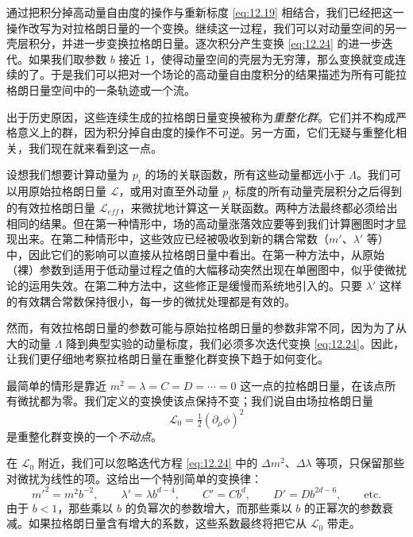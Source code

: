 通过把积分掉高动量自由度的操作与重新标度 \eqref{eq:12.19} 相结合，我们已经把这一操作改写为对拉格朗日量的一个变换。继续这一过程，我们可以对动量空间的另一壳层积分，并进一步变换拉格朗日量。逐次积分产生变换 \eqref{eq:12.24} 的进一步迭代。如果我们取参数 $b$ 接近 1，使得动量空间的壳层为无穷薄，那么变换就变成连续的了。于是我们可以把对一个场论的高动量自由度积分的结果描述为所有可能拉格朗日量空间中的一条轨迹或一个流。

出于历史原因，这些连续生成的拉格朗日量变换被称为\emph{重整化群}。它们并不构成严格意义上的群，因为积分掉自由度的操作不可逆。另一方面，它们无疑与重整化相关，我们现在就来看到这一点。

设想我们想要计算动量为 $p_i$ 的场的关联函数，所有这些动量都远小于 $\Lambda$。我们可以用原始拉格朗日量 $\mathcal{L}$，或用对直至外动量 $p_i$ 标度的所有动量壳层积分之后得到的有效拉格朗日量 $\mathcal{L}_{eff}$，来微扰地计算这一关联函数。两种方法最终都必须给出相同的结果。但在第一种情形中，场的高动量涨落效应要等到我们计算圈图时才显现出来。在第二种情形中，这些效应已经被吸收到新的耦合常数（$m'$、$\lambda'$ 等）中，因此它们的影响可以直接从拉格朗日量中看出。在第一种方法中，从原始（裸）参数到适用于低动量过程之值的大幅移动突然出现在单圈图中，似乎使微扰论的运用失效。在第二种方法中，这些修正是缓慢而系统地引入的。只要 $\lambda'$ 这样的有效耦合常数保持很小，每一步的微扰处理都是有效的。

然而，有效拉格朗日量的参数可能与原始拉格朗日量的参数非常不同，因为为了从大的动量 $\Lambda$ 降到典型实验的动量标度，我们必须多次迭代变换 \eqref{eq:12.24}。因此，让我们更仔细地考察拉格朗日量在重整化群变换下趋于如何变化。

最简单的情形是靠近 $m^2 = \lambda = C = D = \cdots = 0$ 这一点的拉格朗日量，在该点所有微扰都为零。我们定义的变换使该点保持不变；我们说自由场拉格朗日量
\begin{equation}
  \mathcal{L}_0 = \tfrac{1}{2}(\partial_\mu\phi)^2
  \label{eq:12.25}
\end{equation}
是重整化群变换的一个\emph{不动点}。

在 $\mathcal{L}_0$ 附近，我们可以忽略迭代方程 \eqref{eq:12.24} 中的 $\Delta m^2$、$\Delta\lambda$ 等项，只保留那些对微扰为线性的项。这给出一个特别简单的变换律：
\begin{equation}
  m'^2 = m^2b^{-2},\qquad \lambda' = \lambda b^{d-4},\qquad C' = Cb^d,\qquad
  D' = Db^{2d-6},\qquad \text{etc.}
  \label{eq:12.26}
\end{equation}
由于 $b < 1$，那些乘以 $b$ 的负幂次的参数增大，而那些乘以 $b$ 的正幂次的参数衰减。如果拉格朗日量含有增大的系数，这些系数最终将把它从 $\mathcal{L}_0$ 带走。

